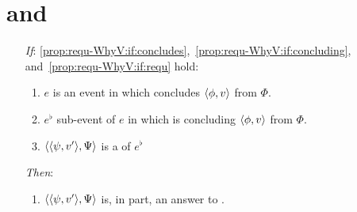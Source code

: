 \section{ and \qWhyV{}}
\label{cha:binding:sec:requ-qWhyV}

\begin{note}

  \begin{proposition}
    \label{prop:requ-WhyV}

    \begin{itemize}
    \item[\emph{If}:]
      \ref{prop:requ-WhyV:if:concludes},~\ref{prop:requ-WhyV:if:concluding}, and~\ref{prop:requ-WhyV:if:requ} hold:
      \begin{enumerate}[label=\alph*., ref=(\alph*), series=propRequWhyVSeries]
      \item
        \label{prop:requ-WhyV:if:concludes}
        \(e\) is an event in which \vAgent{} concludes \(\langle \phi, v \rangle\) from \(\Phi\).
      \item
        \label{prop:requ-WhyV:if:concluding}
        \(e^{\flat}\) sub-event of \(e\) in which \vAgent{} is concluding \(\langle \phi, v \rangle\) from \(\Phi\).
      \item
        \label{prop:requ-WhyV:if:requ}
        \(\langle \langle \psi, v' \rangle, \Psi \rangle\) is a \requ{} of \(e^{\flat}\)
      \end{enumerate}
    \item[\emph{Then}:]
      \begin{enumerate}[label=\alph*., ref=(\alph*), resume*=propRequWhyVSeries]
      \item
        \label{prop:requ-WhyV:tn:answer}
        \(\langle \langle \psi, v' \rangle, \Psi \rangle\) is, in part, an answer to \qWhyV{}.
      \end{enumerate}
    \end{itemize}
    \vspace{-\baselineskip}
  \end{proposition}


\end{note}
